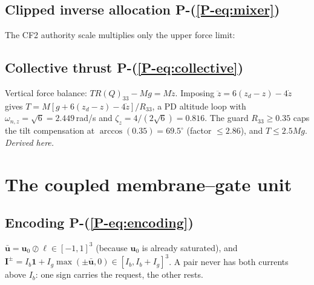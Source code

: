 \documentclass[11pt]{article}
\newcommand{\srcroot}{../../..}
\newcommand{\T}{^{\mathsf T}}
\newcommand{\PE}[1]{P-(\ref{P-#1})}          %
\newcommand{\code}[1]{\texttt{\detokenize{#1}}}
\theoremstyle{remark}
\newcommand{\listing}[4]{%
  }
\begin{document}
\subsection{Clipped inverse allocation \PE{eq:mixer}}
\listing{experiments/nengo_nef_replication_2026-08-29/run_mujoco_nef.py}{309}{314}{$\bm f_{\rm req}=B^{-1}[T,\bm u\T]\T$, clip to $[0,\bm f_{\max}]$}
The CF2 authority scale multiplies only the upper force limit:
\listing{experiments/nengo_nef_replication_2026-08-29/run_mujoco_nef.py}{183}{188}{actuator scale}

\subsection{Collective thrust \PE{eq:collective}}
Vertical force balance: $T R(Q)_{33}-Mg=M\ddot z$. Imposing
$\ddot z=6(z_d-z)-4\dot z$ gives $T=M[g+6(z_d-z)-4\dot z]/R_{33}$, a PD altitude loop with
$\omega_{n,z}=\sqrt6=2.449$\,rad/s and $\zeta_z=4/(2\sqrt6)=0.816$. The guard $R_{33}\ge0.35$ caps the
tilt compensation at $\arccos(0.35)=69.5^\circ$ (factor $\le2.86$), and $T\le2.5Mg$. \emph{Derived here.}
\listing{experiments/nengo_nef_replication_2026-08-29/run_mujoco_nef.py}{289}{295}{collective thrust}

\section{The coupled membrane--gate unit}\label{sec:cmg}
\subsection{Encoding \PE{eq:encoding}}
$\bar{\bm u}=\bm u_0\oslash\bm\ell\in[-1,1]^3$ (because $\bm u_0$ is already saturated), and
$\bm I^\pm=I_b\bm1+I_g\max(\pm\bar{\bm u},0)\in[I_b,I_b+I_g]^3$. A pair never has both currents above
$I_b$: one sign carries the request, the other rests.
\listing{experiments/nengo_nef_replication_2026-08-29/run_mujoco_nef.py}{231}{239}{normalized request and paired currents (logging copy)}
\listing{experiments/nengo_nef_replication_2026-08-29/nengo_cmg.py}{318}{330}{the same encoding inside the Nengo augmentor}
\end{document}
